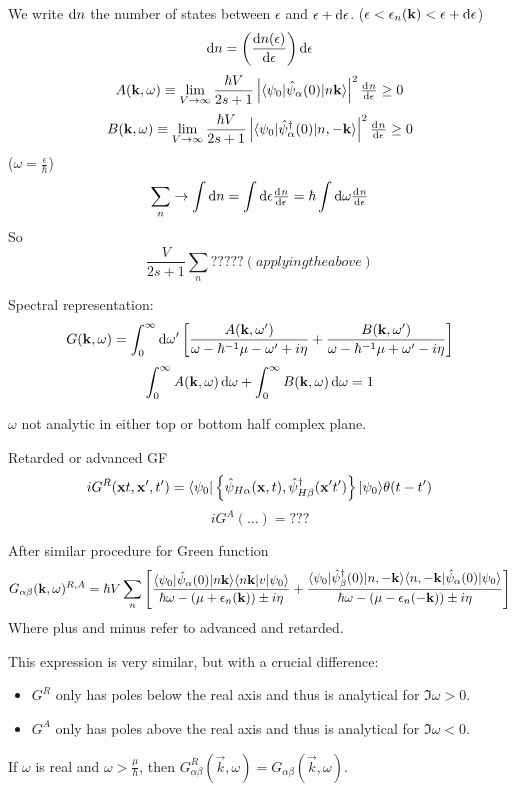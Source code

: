 We write $\operatorname{d \!}{n}$ the number of states between $\epsilon$ and $\epsilon+\operatorname{d \!}{\epsilon}$. ($\epsilon < \epsilon_n(\bm{\mathrm{k}}) < \epsilon + \operatorname{d \!}{\epsilon}$)
\[ \operatorname{d \!}{n} = \left(\frac{\operatorname{d \!}{n}(\epsilon)}{\operatorname{d \!}{\epsilon}}\right)\operatorname{d \!}{\epsilon} \]
\[ A(\vec{k},\omega) \equiv \lim_{V\to\infty} \frac{\hbar V}{2s+1}\left|\braket[\hat{\psi}_\alpha(0)]{\psi_0}{n\vec{k}}\right|^2 \od{n}{\epsilon} \geq 0 \]
\[ B(\vec{k},\omega) \equiv \lim_{V\to\infty} \frac{\hbar V}{2s+1}\left|\braket[\hat{\psi}^\dagger_\alpha(0)]{\psi_0}{n,-\vec{k}}\right|^2 \od{n}{\epsilon} \geq 0 \]
($\omega = \frac{\epsilon}{\hbar}$)
\[\sum_n \to \int \diff{n} = \int \diff{\epsilon}\od{n}{\epsilon} = \hbar \int \diff{\omega}\od{n}{\epsilon}\]
So
\[\frac{V}{2s+1}\sum_n ????? (applying the above)\]

Spectral representation:
\[ G(\bm{\mathrm{k}},\omega) = \int^\infty_0 \operatorname{d \!}{\omega'} \left[\frac{A(\bm{\mathrm{k}},\omega')}{\omega - \hbar^{-1}\mu - \omega'+i\eta} + \frac{B(\bm{\mathrm{k}},\omega')}{\omega - \hbar^{-1}\mu + \omega'-i\eta} \right] \]
\[ \int_0^\infty A(\bm{\mathrm{k}},\omega)\operatorname{d \!}{\omega} + \int_0^\infty B(\bm{\mathrm{k}},\omega)\operatorname{d \!}{\omega}= 1 \]

$\omega$ not analytic in either top or bottom half complex plane.

Retarded or advanced GF
\[ iG^R(\vec{x}t, \vec{x}',t') = \braket[\left\{\hat{\psi}_{H\alpha}(\vec{x},t), \hat{\psi}^\dagger_{H\beta}(\vec{x}'t')\right\}]{\psi_0}{\psi_0}\theta(t-t') \]
\[ iG^A(...) = ??? \]

After similar procedure for Green function
\[G_{\alpha\beta}(\vec{k},\omega)^{R,A} = \hbar V \sum_n \left[ \frac{\braket[\hat{\psi}_\alpha(0)]{\psi_0}{n\vec{k}}\braket[v]{n\vec{k}}{\psi_0}}{\hbar\omega - (\mu+\epsilon_n(\vec{k}))\pm i\eta} + \frac{\braket[\hat{\psi}^\dagger_\beta(0)]{\psi_0}{n, -\vec{k}}\braket[\hat{\psi}_\alpha(0)]{n, -\vec{k}}{\psi_0}}{\hbar\omega - (\mu-\epsilon_n(-\vec{k}))\pm i\eta} \right]\]
Where plus and minus refer to advanced and retarded.

This expression is very similar, but with a crucial difference:
\begin{itemize}
\item $G^R$ only has poles below the real axis and thus is analytical for $\Im \omega >0$.
\item $G^A$ only has poles above the real axis and thus is analytical for $\Im \omega <0$.
\end{itemize}
If $\omega$ is real and $\omega > \frac{\mu}{\hbar}$, then $G^R_{\alpha\beta}(\vec{k},\omega) = G_{\alpha\beta}(\vec{k},\omega)$.


